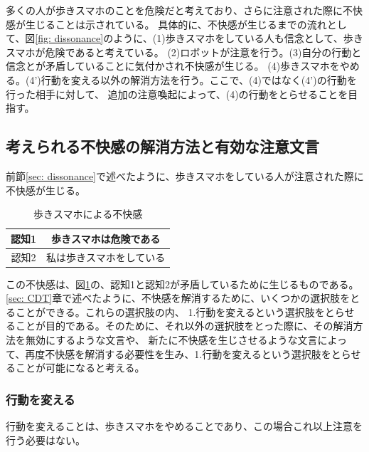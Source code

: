 \documentclass[11pt,a4j]{jreport}
\begin{document}
多くの人が歩きスマホのことを危険だと考えており、さらに注意された際に不快感が生じることは示されている\cite{Schneider2022}。
具体的に、不快感が生じるまでの流れとして、図\ref{fig: dissonance}のように、(1)歩きスマホをしている人も信念として、歩きスマホが危険であると考えている。
(2)ロボットが注意を行う。(3)自分の行動と信念とが矛盾していることに気付かされ不快感が生じる。
(4)歩きスマホをやめる。(4')行動を変える以外の解消方法を行う。ここで、(4)ではなく(4')の行動を行った相手に対して、
追加の注意喚起によって、(4)の行動をとらせることを目指す。

\subsection{考えられる不快感の解消方法と有効な注意文言}
前節\ref{sec: dissonance}で述べたように、歩きスマホをしている人が注意された際に不快感が生じる。
\begin{table}[h]
  \centering
  
  \label{fig: UsingPhone}
  \begin{tabular}{c|c}

      認知1 & 歩きスマホは危険である  \\ \hline
      認知2 & 私は歩きスマホをしている \\ 
  \end{tabular}
  \caption{歩きスマホによる不快感}
\end{table}
この不快感は、図\ref{fig: UsingPhone}の、認知1と認知2が矛盾しているために生じるものである。
\ref{sec: CDT}章で述べたように、不快感を解消するために、いくつかの選択肢をとることができる。これらの選択肢の内、
1.行動を変えるという選択肢をとらせることが目的である。そのために、それ以外の選択肢をとった際に、その解消方法を無効にするような文言や、
新たに不快感を生じさせるような文言によって、再度不快感を解消する必要性を生み、1.行動を変えるという選択肢をとらせることが可能になると考える。

\subsubsection{行動を変える}
行動を変えることは、歩きスマホをやめることであり、この場合これ以上注意を行う必要はない。
\end{document}
